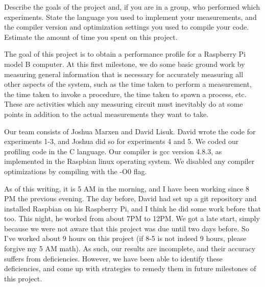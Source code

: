 Describe the goals of the project and, if you are in a group, who performed which experiments. State the language you used to implement your measurements, and the compiler version and optimization settings you used to compile your code. Estimate the amount of time you spent on this project. 

The goal of this project is to obtain a performance profile for a Raspberry Pi model B computer. At this first milestone, we do some basic ground work by measuring general information that is necessary for accurately measuring all other aspects of the system, such as the time taken to perform a measurement, the time taken to invoke a procedure, the time taken to spawn a process, etc. These are activities which any measuring circuit must inevitably do at some points in addition to the actual measurements they want to take. 

Our team consists of Joshua Marxen and David Lisuk. David wrote the code for experiments 1-3, and Joshua did so for experiments 4 and 5. We coded our profiling code in the C language. Our compiler is gcc version 4.8.3, as implemented in the Raspbian linux operating system. We disabled any compiler optimizations by compiling with the -O0 flag.

As of this writing, it is 5 AM in the morning, and I have been working since 8 PM the previous evening. The day before, David had set up a git repository and installed Raspbian on his Raspberry Pi, and I think he did some work before that too. This night, he worked from about 7PM to 12PM. We got a late start, simply because we were not aware that this project was due until two days before. So I've worked about 9 hours on this project (if 8-5 is not indeed 9 hours, please forgive my 5 AM math). As such, our results are incomplete, and their accuracy suffers from deficiencies. However, we have been able to identify these deficiencies, and come up with strategies to remedy them in future milestones of this project.